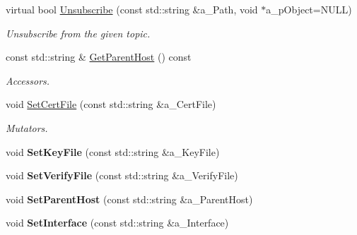 \begin{DoxyCompactItemize}
virtual bool \hyperlink{class_topic_manager_a5d1380adbc66f961a43179cb079d28d8}{Unsubscribe} (const std\+::string \&a\+\_\+\+Path, void $\ast$a\+\_\+p\+Object=N\+U\+LL)
\begin{DoxyCompactList}\small\item\em Unsubscribe from the given topic. \end{DoxyCompactList}\item 
\mbox{\label{class_topic_manager_a526d2e5f71fd6b73cdad169f700a11f1}} 
const std\+::string \& \hyperlink{class_topic_manager_a526d2e5f71fd6b73cdad169f700a11f1}{Get\+Parent\+Host} () const
\begin{DoxyCompactList}\small\item\em Accessors. \end{DoxyCompactList}\item 
\mbox{\label{class_topic_manager_a43273dba6ec08330e5e50fe9aa39e134}} 
void \hyperlink{class_topic_manager_a43273dba6ec08330e5e50fe9aa39e134}{Set\+Cert\+File} (const std\+::string \&a\+\_\+\+Cert\+File)
\begin{DoxyCompactList}\small\item\em Mutators. \end{DoxyCompactList}\item 
\mbox{\label{class_topic_manager_a665211287a9e390acf9862fd0d9f7167}} 
void {\bfseries Set\+Key\+File} (const std\+::string \&a\+\_\+\+Key\+File)
\item 
\mbox{\label{class_topic_manager_a56c8fe63b366fe5162b65196c509b622}} 
void {\bfseries Set\+Verify\+File} (const std\+::string \&a\+\_\+\+Verify\+File)
\item 
\mbox{\label{class_topic_manager_a780bc089a2470aec0582273bca18d2e9}} 
void {\bfseries Set\+Parent\+Host} (const std\+::string \&a\+\_\+\+Parent\+Host)
\item 
\mbox{\label{class_topic_manager_a807b8205f70c08313244ffe68c93e72d}} 
void {\bfseries Set\+Interface} (const std\+::string \&a\+\_\+\+Interface)
\item 
\mbox{\label{class_topic_manager_a2d43bb5f29bcead18d524804976628ec}} 

\end{DoxyCompactItemize}
